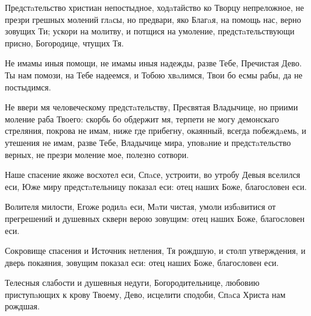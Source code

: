 \begin{mymulticols}

Предстaтельство христиан непостыдное, ходaтайство ко Творцу непреложное, не презри грешных молений глaсы, но предвари, яко Благaя, на помощь нас, верно зовущих Ти; ускори на молитву, и потщися на умоление, предстaтельствующи присно, Богородице, чтущих Тя.


 Не имамы иныя помощи, не имамы иныя надежды, разве Тебе, Пречистая Дево. Ты нам помози, на Тебе надеемся, и Тобою хвaлимся, Твои бо есмы рабы, да не постыдимся.


Не ввери мя человеческому предстaтельству, Пресвятая Владычице, но приими моление раба Твоего: скорбь бо обдержит мя, терпети не могу демонскаго стреляния, покрова не имам, ниже где прибегну, окаянный, всегда побеждaемь, и утешения не имам, разве Тебе, Владычице мира, уповaние и предстaтельство верных, не презри моление мое, полезно сотвори.




Наше спасение якоже восхотел еси, Спaсе, устроити, во утробу Девыя вселился еси, Юже миру предстaтельницу показал еси: отец наших Боже, благословен еси.


Волителя милости, Егоже родилa еси, Мaти чистая, умоли избaвитися от прегрешений и душевных скверн верою зовущим: отец наших Боже, благословен еси.

\slava

Сокровище спасения и Источник нетления, Тя рождшую, и столп утверждения, и дверь покаяния, зовущим показал еси: отец наших Боже, благословен еси.

\inyne

Телесныя слабости и душевныя недуги, Богородительнице, любовию приступaющих к крову Твоему, Дево, исцелити сподоби, Спaса Христа нам рождшая.





\end{mymulticols}
